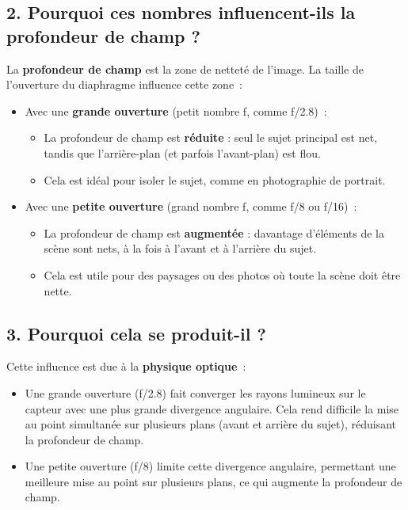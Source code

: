 \documentclass[answers]{exam}
\begin{document}
\subsection*{2. Pourquoi ces nombres influencent-ils la profondeur de champ ?}

La \textbf{profondeur de champ} est la zone de netteté de l'image. La taille de l'ouverture du diaphragme influence cette zone :
\begin{itemize}[noitemsep]
    \item Avec une \textbf{grande ouverture} (petit nombre f, comme f/2.8) :
    \begin{itemize}[noitemsep]
        \item La profondeur de champ est \textbf{réduite} : seul le sujet principal est net, tandis que l'arrière-plan (et parfois l'avant-plan) est flou.
        \item Cela est idéal pour isoler le sujet, comme en photographie de portrait.
    \end{itemize}
    \item Avec une \textbf{petite ouverture} (grand nombre f, comme f/8 ou f/16) :
    \begin{itemize}[noitemsep]
        \item La profondeur de champ est \textbf{augmentée} : davantage d'éléments de la scène sont nets, à la fois à l'avant et à l'arrière du sujet.
        \item Cela est utile pour des paysages ou des photos où toute la scène doit être nette.
    \end{itemize}
\end{itemize}

\subsection*{3. Pourquoi cela se produit-il ?}

Cette influence est due à la \textbf{physique optique} :
\begin{itemize}[noitemsep]
    \item Une grande ouverture (f/2.8) fait converger les rayons lumineux sur le capteur avec une plus grande divergence angulaire. Cela rend difficile la mise au point simultanée sur plusieurs plans (avant et arrière du sujet), réduisant la profondeur de champ.
    \item Une petite ouverture (f/8) limite cette divergence angulaire, permettant une meilleure mise au point sur plusieurs plans, ce qui augmente la profondeur de champ.
\end{itemize}
\end{document}
